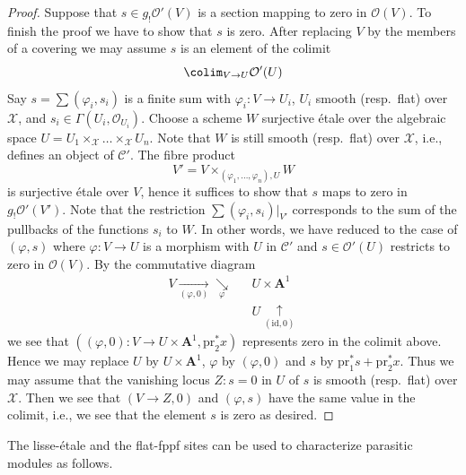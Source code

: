 \begin{proof}
\medskip\noindent
Suppose that $s \in g_!\mathcal{O}'(V)$ is a section
mapping to zero in $\mathcal{O}(V)$. To finish the proof we have to show
that $s$ is zero. After replacing $V$ by the members
of a covering we may assume $s$ is an element of the colimit
$$
\colim_{V \to U} \mathcal{O}'(U)
$$
Say $s = \sum (\varphi_i, s_i)$ is a finite sum with
$\varphi_i : V \to U_i$, $U_i$ smooth (resp.\ flat) over $\mathcal{X}$, and
$s_i \in \Gamma(U_i, \mathcal{O}_{U_i})$. Choose a scheme $W$ surjective
\'etale over the algebraic space
$U = U_1 \times_\mathcal{X} \ldots \times_\mathcal{X} U_n$.
Note that $W$ is still smooth (resp.\ flat) over $\mathcal{X}$, i.e.,
defines an object of $\mathcal{C}'$. The fibre product
$$
V' = V \times_{(\varphi_1, \ldots, \varphi_n), U} W
$$
is surjective \'etale over $V$, hence it suffices to show that $s$ maps
to zero in $g_!\mathcal{O}'(V')$. Note that the restriction
$\sum (\varphi_i, s_i)|_{V'}$ corresponds to the sum of the pullbacks
of the functions $s_i$ to $W$. In other words, we have reduced to the case
of $(\varphi, s)$ where $\varphi : V \to U$ is a morphism with $U$ in
$\mathcal{C}'$ and $s \in \mathcal{O}'(U)$ restricts to zero in
$\mathcal{O}(V)$. By the commutative diagram
$$
\begin{array}{ccc}V \underset{(\varphi, 0)}{\longrightarrow}\underset{\varphi}{\searrow} &  & U \times \mathbf{A}^1 \\  &  & U \underset{(\text{id}, 0)}{\uparrow}\end{array}
$$
we see that
$((\varphi, 0) : V \to U \times \mathbf{A}^1, \text{pr}_2^*x)$
represents zero in the colimit above. Hence we may
replace $U$ by $U \times \mathbf{A}^1$, $\varphi$ by $(\varphi, 0)$
and $s$ by $\text{pr}_1^*s + \text{pr}_2^*x$. Thus we may assume that
the vanishing locus $Z : s = 0$ in $U$ of $s$ is smooth (resp.\ flat)
over $\mathcal{X}$. Then we see that $(V \to Z, 0)$ and $(\varphi, s)$
have the same value in the colimit, i.e., we see that the element $s$
is zero as desired.
\end{proof}

The lisse-\'etale and the flat-fppf sites can be used to characterize
parasitic modules as follows.

